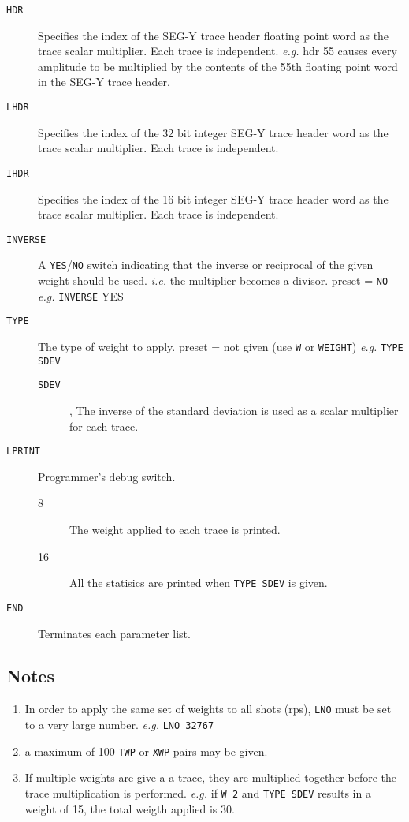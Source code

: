 \begin{description}
\item[\texttt{HDR}] Specifies the index of the SEG-Y trace header floating point word
         as the trace scalar multiplier.  Each trace is independent.
         \textit{e.g.} hdr 55   causes every amplitude to be multiplied by the
         contents of the 55th floating point word in the SEG-Y trace header.

\item[\texttt{LHDR}] Specifies the index of the 32 bit integer SEG-Y trace header word
         as the trace scalar multiplier.  Each trace is independent.

\item[\texttt{IHDR}] Specifies the index of the 16 bit integer SEG-Y trace header word
         as the trace scalar multiplier.  Each trace is independent.

\item[\texttt{INVERSE}] A \texttt{YES}/\texttt{NO} switch indicating that the inverse or reciprocal of
          the given weight should be used.  \textit{i.e.} the multiplier becomes
          a divisor.
          \Gls{preset} = \texttt{NO}      \textit{e.g.}  \texttt{INVERSE} YES

\item[\texttt{TYPE}] The type of weight to apply.
         \Gls{preset} = not given (use \texttt{W} or \texttt{WEIGHT})     \textit{e.g.}  \texttt{TYPE SDEV}
\begin{description}
\item[\texttt{SDEV}] , The inverse of the standard deviation is used as a scalar multiplier for each trace.
\end{description}

\item[\texttt{LPRINT}] Programmer's debug switch.
\begin{description}
\item[8] The weight applied to each trace is printed.
\item[16] All the statisics are printed when \texttt{TYPE SDEV} is given.
\end{description}

\item[\texttt{END}] Terminates each parameter list.
\end{description}

\subsection{Notes}
\begin{enumerate}
\item In order to apply the same set of weights to all \glspl{shot} (\glspl{rp}), \texttt{LNO} must be set to a very large number. \textit{e.g.}  \texttt{LNO 32767}
\item a maximum of 100 \texttt{TWP} or \texttt{XWP} pairs may be given.
\item If multiple weights are give a a trace, they are multiplied together before the trace multiplication is performed.  \textit{e.g.} if \texttt{W 2} and \texttt{TYPE SDEV} results in a weight of 15, the total weigth applied is 30.
\end{enumerate}

